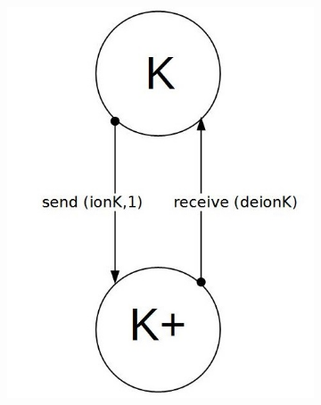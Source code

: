 \documentclass[11pt]{report}
\begin{document}
\begin{figure}[!h]
    \centering
    \begin{subfigure}[b]{0.3\textwidth}
        \includegraphics[width=\textwidth]{K.jpg}
    \end{subfigure}
    \begin{subfigure}[b]{0.3\textwidth}

\end{subfigure}
\end{figure}
\end{document}
